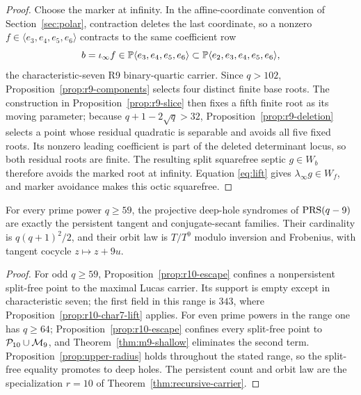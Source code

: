\begin{proof}
Choose the marker at infinity.  In the affine-coordinate convention of
Section~\ref{sec:polar}, contraction deletes the last coordinate, so a
nonzero \(f\in\langle e_3,e_4,e_5,e_6\rangle\) contracts to the same
coefficient row
\[
 b=\iota_\infty f\in
 \mathbb P\langle e_3,e_4,e_5,e_6\rangle
 \subset\mathbb P\langle e_2,e_3,e_4,e_5,e_6\rangle,
\]
the characteristic-seven R9 binary-quartic carrier.  Since \(q>102\),
Proposition~\ref{prop:r9-components} selects four distinct finite base
roots.  The construction in Proposition~\ref{prop:r9-slice} then fixes a
fifth finite root as its moving parameter; because
\(q+1-2\sqrt q>32\), Proposition~\ref{prop:r9-deletion} selects a point
whose residual quadratic is separable and avoids all five fixed roots.
Its nonzero leading coefficient is part of the deleted determinant locus,
so both residual roots are finite.  The resulting split squarefree septic
\(g\in W_b\) therefore avoids the marked root at infinity.  Equation
\eqref{eq:lift} gives \(\lambda_\infty g\in W_f\), and marker avoidance
makes this octic squarefree.
\end{proof}

\begin{corollary}\label{cor:r10}%
%
%
%
%
For every prime power $q\geq59$, the projective deep-hole syndromes of
$\operatorname{PRS}(q-9)$ are exactly the persistent tangent and conjugate-secant
families.  Their cardinality is $q(q+1)^2/2$, and their orbit law is
$T/T^9$ modulo inversion and Frobenius, with tangent cocycle
$z\mapsto z+9u$.
\end{corollary}

\begin{proof}
For odd $q\geq59$, Proposition~\ref{prop:r10-escape} confines a
nonpersistent split-free point to the maximal Lucas carrier.  Its support
is empty except in characteristic seven; the
first field in this range is \(343\), where
Proposition~\ref{prop:r10-char7-lift} applies.
For even prime powers in the range one has $q\geq64$;
Proposition~\ref{prop:r10-escape} confines every split-free point to
$\mathcal P_{10}\cup\mathcal M_9$, and Theorem~\ref{thm:m9-shallow} eliminates the
second term.  Proposition~\ref{prop:upper-radius} holds throughout the stated range, so the
split-free equality promotes to deep holes.  The persistent count and orbit
law are the specialization $r=10$ of
Theorem~\ref{thm:recursive-carrier}.
\end{proof}
